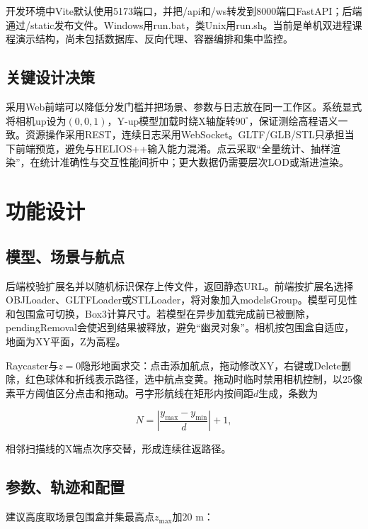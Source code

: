 \documentclass[a4paper,fleqn]{cas-sc}
\begin{document}
开发环境中Vite默认使用5173端口，并把/api和/ws转发到8000端口FastAPI；后端通过/static发布文件。Windows用run.bat，类Unix用run.sh。当前是单机双进程课程演示结构，尚未包括数据库、反向代理、容器编排和集中监控。

\subsection{关键设计决策}

采用Web前端可以降低分发门槛并把场景、参数与日志放在同一工作区\citep{viswebdrone,lidarWebgis}。系统显式将相机up设为$(0,0,1)$，Y-up模型加载时绕X轴旋转$90^\circ$，保证测绘高程语义一致。资源操作采用REST，连续日志采用WebSocket\citep{fielding2000rest,WebSocket}。GLTF/GLB/STL只承担当下前端预览，避免与HELIOS++输入能力混淆。点云采取“全量统计、抽样渲染”，在统计准确性与交互性能间折中；更大数据仍需要层次LOD或渐进渲染\citep{pointCloudRendering,pointCloudTerrain}。

\section{功能设计}

\subsection{模型、场景与航点}

后端校验扩展名并以随机标识保存上传文件，返回静态URL。前端按扩展名选择OBJLoader、GLTFLoader或STLLoader，将对象加入modelsGroup。模型可见性和包围盒可切换，Box3计算尺寸。若模型在异步加载完成前已被删除，pendingRemoval会使迟到结果被释放，避免“幽灵对象”。相机按包围盒自适应，地面为XY平面，Z为高程。

Raycaster与$z=0$隐形地面求交：点击添加航点，拖动修改XY，右键或Delete删除，红色球体和折线表示路径，选中航点变黄。拖动时临时禁用相机控制，以25像素平方阈值区分点击和拖动。弓字形航线在矩形内按间距$d$生成，条数为

\begin{equation}
N = \left| \frac{y_{\max} - y_{\min}}{d} \right| + 1,
\end{equation}

相邻扫描线的X端点次序交替，形成连续往返路径。

\subsection{参数、轨迹和配置}

建议高度取场景包围盒并集最高点$z_{\max}$加$20\text{ m}$：
\end{document}
